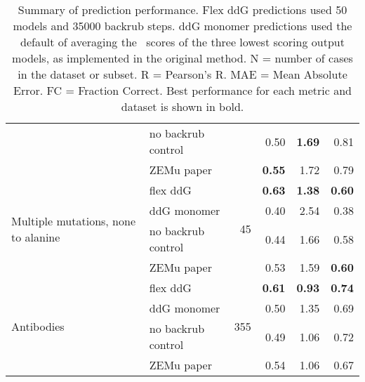 \begin{table}
\begin{tabular}{llrrrr}
 & no backrub control & & 0.50 & \textbf{1.69} & 0.81  \\
 & ZEMu paper & & \textbf{0.55} & 1.72 & 0.79  \\
\hline
 \multirow{ 4}{*}{Multiple mutations, none to alanine} & flex ddG & \multirow{ 4}{*}{45} & \textbf{0.63} & \textbf{1.38} & \textbf{0.60}  \\
 & ddG monomer & & 0.40 & 2.54 & 0.38  \\
 & no backrub control & & 0.44 & 1.66 & 0.58  \\
 & ZEMu paper & & 0.53 & 1.59 & \textbf{0.60}  \\
\hline
 \multirow{ 4}{*}{Antibodies} & flex ddG & \multirow{ 4}{*}{355} & \textbf{0.61} & \textbf{0.93} & \textbf{0.74}  \\
 & ddG monomer & & 0.50 & 1.35 & 0.69  \\
 & no backrub control & & 0.49 & 1.06 & 0.72  \\
 & ZEMu paper & & 0.54 & 1.06 & 0.67  \\
\bottomrule
\end{tabular}
  \caption[]{
    Summary of prediction performance. Flex ddG predictions used 50 models and 35000 backrub steps. ddG monomer predictions used the default of averaging the \ddg\ scores of the three lowest scoring output models, as implemented in the original method\cite{kellogg_role_2011}. N = number of cases in the dataset or subset. R = Pearson's R. MAE = Mean Absolute Error. FC = Fraction Correct. Best performance for each metric and dataset is shown in bold.
  } \label{tab:table-main}
\end{table}
